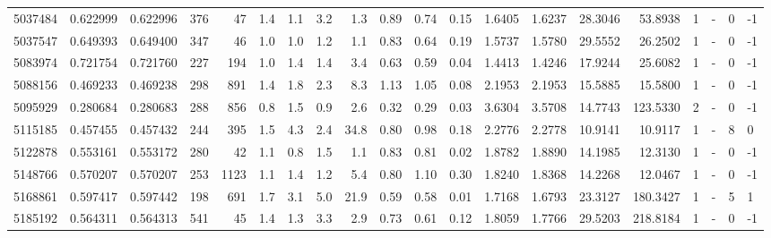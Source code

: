 \begin{tabular}{rrrrrrrrrrrrrrrrrlrl}
   5037484 & 0.622999 &   0.622996 &  376 &   47 &      1.4 &      1.1 &     3.2 &      1.3 &       0.89 &        0.74 &        0.15 &  1.6405 &  1.6237 &   28.3046 &   53.8938 &       1 &             - &        0 &        -1 \\
   5037547 & 0.649393 &   0.649400 &  347 &   46 &      1.0 &      1.0 &     1.2 &      1.1 &       0.83 &        0.64 &        0.19 &  1.5737 &  1.5780 &   29.5552 &   26.2502 &       1 &             - &        0 &        -1 \\
   5083974 & 0.721754 &   0.721760 &  227 &  194 &      1.0 &      1.4 &     1.4 &      3.4 &       0.63 &        0.59 &        0.04 &  1.4413 &  1.4246 &   17.9244 &   25.6082 &       1 &             - &        0 &        -1 \\
   5088156 & 0.469233 &   0.469238 &  298 &  891 &      1.4 &      1.8 &     2.3 &      8.3 &       1.13 &        1.05 &        0.08 &  2.1953 &  2.1953 &   15.5885 &   15.5800 &       1 &             - &        0 &        -1 \\
   5095929 & 0.280684 &   0.280683 &  288 &  856 &      0.8 &      1.5 &     0.9 &      2.6 &       0.32 &        0.29 &        0.03 &  3.6304 &  3.5708 &   14.7743 &  123.5330 &       2 &             - &        0 &        -1 \\
   5115185 & 0.457455 &   0.457432 &  244 &  395 &      1.5 &      4.3 &     2.4 &     34.8 &       0.80 &        0.98 &        0.18 &  2.2776 &  2.2778 &   10.9141 &   10.9117 &       1 &             - &        8 &         0 \\
   5122878 & 0.553161 &   0.553172 &  280 &   42 &      1.1 &      0.8 &     1.5 &      1.1 &       0.83 &        0.81 &        0.02 &  1.8782 &  1.8890 &   14.1985 &   12.3130 &       1 &             - &        0 &        -1 \\
   5148766 & 0.570207 &   0.570207 &  253 & 1123 &      1.1 &      1.4 &     1.2 &      5.4 &       0.80 &        1.10 &        0.30 &  1.8240 &  1.8368 &   14.2268 &   12.0467 &       1 &             - &        0 &        -1 \\
   5168861 & 0.597417 &   0.597442 &  198 &  691 &      1.7 &      3.1 &     5.0 &     21.9 &       0.59 &        0.58 &        0.01 &  1.7168 &  1.6793 &   23.3127 &  180.3427 &       1 &             - &        5 &         1 \\
   5185192 & 0.564311 &   0.564313 &  541 &   45 &      1.4 &      1.3 &     3.3 &      2.9 &       0.73 &        0.61 &        0.12 &  1.8059 &  1.7766 &   29.5203 &  218.8184 &       1 &             - &        0 &        -1 \\

\end{tabular}
